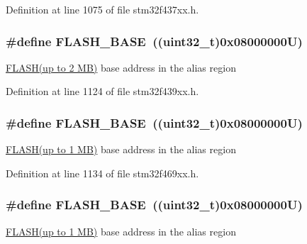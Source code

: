 Definition at line 1075 of file stm32f437xx.\+h.

\subsubsection[{\texorpdfstring{F\+L\+A\+S\+H\+\_\+\+B\+A\+SE}{FLASH_BASE}}]{\setlength{\rightskip}{0pt plus 5cm}\#define F\+L\+A\+S\+H\+\_\+\+B\+A\+SE~((uint32\+\_\+t)0x08000000\+U)}\hypertarget{group___peripheral__memory__map_ga23a9099a5f8fc9c6e253c0eecb2be8db}{}\label{group___peripheral__memory__map_ga23a9099a5f8fc9c6e253c0eecb2be8db}
\hyperlink{group___peripheral__declaration_ga844ea28ba1e0a5a0e497f16b61ea306b}{F\+L\+A\+S\+H(up to 2 M\+B)} base address in the alias region 

Definition at line 1124 of file stm32f439xx.\+h.

\subsubsection[{\texorpdfstring{F\+L\+A\+S\+H\+\_\+\+B\+A\+SE}{FLASH_BASE}}]{\setlength{\rightskip}{0pt plus 5cm}\#define F\+L\+A\+S\+H\+\_\+\+B\+A\+SE~((uint32\+\_\+t)0x08000000\+U)}\hypertarget{group___peripheral__memory__map_ga23a9099a5f8fc9c6e253c0eecb2be8db}{}\label{group___peripheral__memory__map_ga23a9099a5f8fc9c6e253c0eecb2be8db}
\hyperlink{group___peripheral__declaration_ga844ea28ba1e0a5a0e497f16b61ea306b}{F\+L\+A\+S\+H(up to 1 M\+B)} base address in the alias region 

Definition at line 1134 of file stm32f469xx.\+h.

\subsubsection[{\texorpdfstring{F\+L\+A\+S\+H\+\_\+\+B\+A\+SE}{FLASH_BASE}}]{\setlength{\rightskip}{0pt plus 5cm}\#define F\+L\+A\+S\+H\+\_\+\+B\+A\+SE~((uint32\+\_\+t)0x08000000\+U)}\hypertarget{group___peripheral__memory__map_ga23a9099a5f8fc9c6e253c0eecb2be8db}{}\label{group___peripheral__memory__map_ga23a9099a5f8fc9c6e253c0eecb2be8db}
\hyperlink{group___peripheral__declaration_ga844ea28ba1e0a5a0e497f16b61ea306b}{F\+L\+A\+S\+H(up to 1 M\+B)} base address in the alias region 

